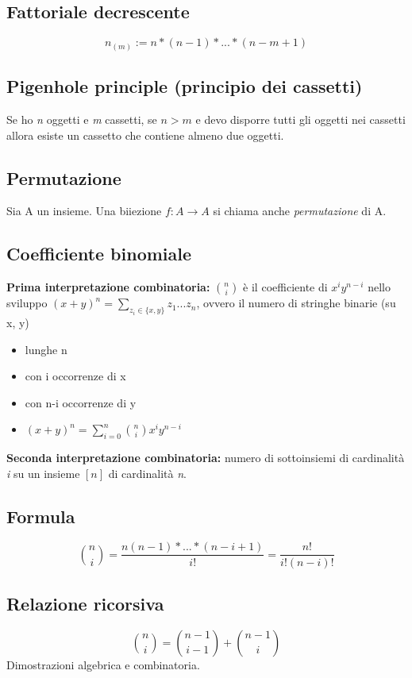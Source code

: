 \subsection{Fattoriale decrescente} 
\[n_{(m)}:= n\ast (n-1)\ast ... \ast (n-m+1)\]

\subsection{Pigenhole principle (principio dei cassetti)} 
Se ho \textit{n} oggetti e \textit{m} cassetti, se \(n>m\) e devo disporre tutti gli oggetti nei cassetti allora esiste un cassetto che contiene almeno due oggetti.

\subsection{Permutazione} 
Sia A un insieme. Una biiezione \(f:A\rightarrow A\) si chiama anche \textit{permutazione} di A.

\subsection{Coefficiente binomiale}
\textbf{Prima interpretazione combinatoria:} \(\binom{n}{i}\) è il coefficiente di \(x^i y^{n-i}\) nello sviluppo \((x+y)^n=\sum _{z_i\in \{x,y\}} z_1 ...z_n\), ovvero il numero di stringhe binarie (su {x, y})
\begin{itemize}
    \item lunghe n
    \item con i occorrenze di x
    \item con n-i occorrenze di y
    \item \((x+y)^n =\sum _{i=0} ^n\binom{n}{i} x^iy^{n-i}\)
\end{itemize}
\noindent\textbf{Seconda interpretazione combinatoria:} numero di sottoinsiemi di cardinalità \textit{i} su un insieme \([n]\) di cardinalità \textit{n}.

\subsection{Formula} 
\[\binom{n}{i}=\frac{n(n-1)\ast ... \ast (n-i+1)}{i!} = \frac{n!}{i!(n-i)!}\]

\subsection{Relazione ricorsiva}
\[\binom{n}{i}=\binom{n-1}{i-1}+\binom{n-1}{i}\]
Dimostrazioni algebrica e combinatoria.

